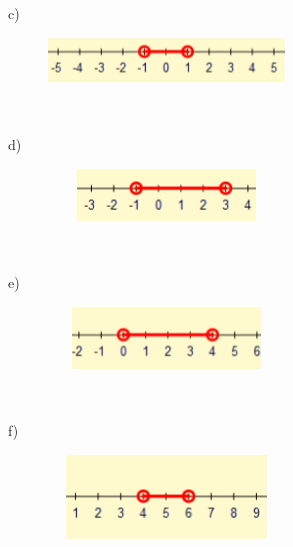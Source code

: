 \begin{respostas}{7}
~~

	c)

	\begin{figure}[H]
		\begin{Center}
			\includegraphics[width=2.47in,height=0.48in]{capitulos/outras_funcoes/media/image82.png}
		\end{Center}
	\end{figure}

~~

	d)

	\begin{figure}[H]
		\begin{Center}
			\includegraphics[width=2.47in,height=0.54in]{capitulos/outras_funcoes/media/image83.png}
		\end{Center}
	\end{figure}

~~

	e)

	\begin{figure}[H]
		\begin{Center}
			\includegraphics[width=2.47in,height=0.65in]{capitulos/outras_funcoes/media/image84.png}
		\end{Center}
	\end{figure}

~~

	f)

	\begin{figure}[H]
		\begin{Center}
			\includegraphics[width=2.47in,height=0.88in]{capitulos/outras_funcoes/media/image85.png}
		\end{Center}
	\end{figure}


\end{respostas}

